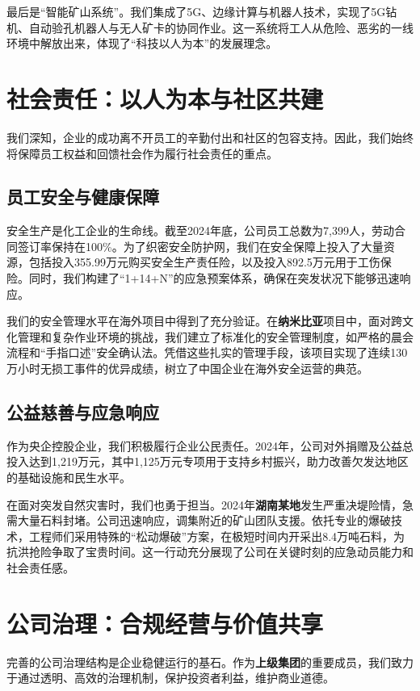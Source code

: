 \documentclass[a4paper,12pt]{article}
\begin{document}
最后是“智能矿山系统”。我们集成了5G、边缘计算与机器人技术，实现了5G钻机、自动验孔机器人与无人矿卡的协同作业。这一系统将工人从危险、恶劣的一线环境中解放出来，体现了“科技以人为本”的发展理念。

\section{社会责任：以人为本与社区共建}

我们深知，企业的成功离不开员工的辛勤付出和社区的包容支持。因此，我们始终将保障员工权益和回馈社会作为履行社会责任的重点。

\subsection{员工安全与健康保障}

安全生产是化工企业的生命线。截至2024年底，公司员工总数为7,399人，劳动合同签订率保持在100\%。为了织密安全防护网，我们在安全保障上投入了大量资源，包括投入355.99万元购买安全生产责任险，以及投入892.5万元用于工伤保险。同时，我们构建了“1+14+N”的应急预案体系，确保在突发状况下能够迅速响应。

我们的安全管理水平在海外项目中得到了充分验证。在\textbf{纳米比亚}项目中，面对跨文化管理和复杂作业环境的挑战，我们建立了标准化的安全管理制度，如严格的晨会流程和“手指口述”安全确认法。凭借这些扎实的管理手段，该项目实现了连续130万小时无损工事件的优异成绩，树立了中国企业在海外安全运营的典范。

\subsection{公益慈善与应急响应}

作为央企控股企业，我们积极履行企业公民责任。2024年，公司对外捐赠及公益总投入达到1,219万元，其中1,125万元专项用于支持乡村振兴，助力改善欠发达地区的基础设施和民生水平。

在面对突发自然灾害时，我们也勇于担当。2024年\textbf{湖南某地}发生严重决堤险情，急需大量石料封堵。公司迅速响应，调集附近的矿山团队支援。依托专业的爆破技术，工程师们采用特殊的“松动爆破”方案，在极短时间内开采出8.4万吨石料，为抗洪抢险争取了宝贵时间。这一行动充分展现了公司在关键时刻的应急动员能力和社会责任感。

\section{公司治理：合规经营与价值共享}

完善的公司治理结构是企业稳健运行的基石。作为\textbf{上级集团}的重要成员，我们致力于通过透明、高效的治理机制，保护投资者利益，维护商业道德。
\end{document}
